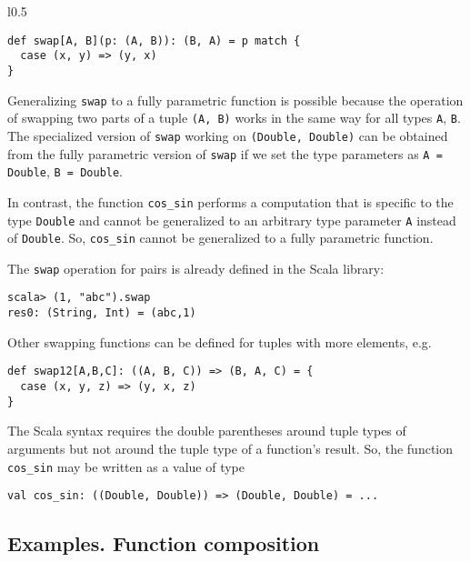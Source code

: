 \begin{wrapfigure}{l}{0.5\columnwidth}%
\vspace{-0.55\baselineskip}
\begin{lstlisting}
def swap[A, B](p: (A, B)): (B, A) = p match {
  case (x, y) => (y, x)
}
\end{lstlisting}
\vspace{-0.95\baselineskip}
\end{wrapfigure}%

\noindent Generalizing \lstinline!swap! to a fully parametric function
is possible because the operation of swapping two parts of a tuple
\lstinline!(A, B)! works in the same way for all types \lstinline!A!,
\lstinline!B!. The specialized version of \lstinline!swap! working
on \lstinline!(Double, Double)! can be obtained from the fully parametric
version of \lstinline!swap! if we set the type parameters as \lstinline!A = Double!,
\lstinline!B = Double!.

In contrast, the function \lstinline!cos_sin! performs a computation
that is specific to the type \lstinline!Double! and cannot be generalized
to an arbitrary type parameter \lstinline!A! instead of \lstinline!Double!.
So, \lstinline!cos_sin! cannot be generalized to a fully parametric
function.

The \lstinline!swap! operation for pairs is already defined in the
Scala library:
\begin{lstlisting}
scala> (1, "abc").swap
res0: (String, Int) = (abc,1)
\end{lstlisting}
Other swapping functions can be defined for tuples with more elements,
e.g.
\begin{lstlisting}
def swap12[A,B,C]: ((A, B, C)) => (B, A, C) = {
  case (x, y, z) => (y, x, z)
}
\end{lstlisting}
The Scala syntax requires the double parentheses around tuple types
of arguments but not around the tuple type of a function's result.
So, the function \lstinline!cos_sin! may be written as a value of
type
\begin{lstlisting}
val cos_sin: ((Double, Double)) => (Double, Double) = ...
\end{lstlisting}


\subsection{Examples. Function composition\label{subsec:Examples-of-fully-parametric}}


